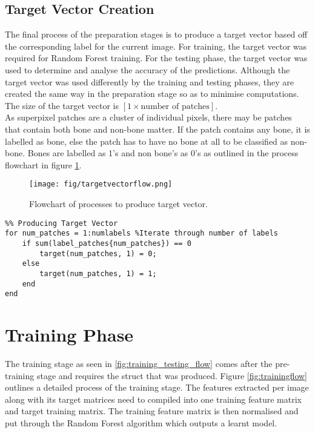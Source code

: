 \subsection{Target Vector Creation}
The final process of the preparation stages is to produce a target vector based off the corresponding label for the current image. For training, the target vector was required for Random Forest training. For the testing phase, the target vector was used to determine and analyse the accuracy of the predictions. Although the target vector was used differently by the training and testing phases, they are created the same way in the preparation stage so as to minimise computations. The size of the target vector is $[1 \times \textrm{number of patches}]$. 
\\[1\baselineskip]
As superpixel patches are a cluster of individual pixels, there may be patches that contain both bone and non-bone matter. If the patch contains any bone, it is labelled as bone, else the patch has to have no bone at all to be classified as non-bone. Bones are labelled as 1's and non bone's as 0's as outlined in the process flowchart in figure \ref{fig:targetvectorflow}.

\begin{figure}[H]
\centering
\texttt{[image: fig/targetvectorflow.png]}
\caption{Flowchart of processes to produce target vector.}
\label{fig:targetvectorflow}
\end{figure}
\bigskip
\bigskip
\begin{lstlisting}
%% Producing Target Vector
for num_patches = 1:numlabels %Iterate through number of labels
    if sum(label_patches{num_patches}) == 0
        target(num_patches, 1) = 0;
    else 
        target(num_patches, 1) = 1;
    end
end
\end{lstlisting}

\section{Training Phase} 
\label{sect: trainstage}
The training stage as seen in \ref{fig:training_testing_flow} comes after the pre-training stage and requires the struct that was produced. Figure \ref{fig:trainingflow} outlines a detailed process of the training stage. The features extracted per image along with its target matrices need to compiled into one training feature matrix and target training matrix. The training feature matrix is then normalised and put through the Random Forest algorithm which outputs a learnt model. 

